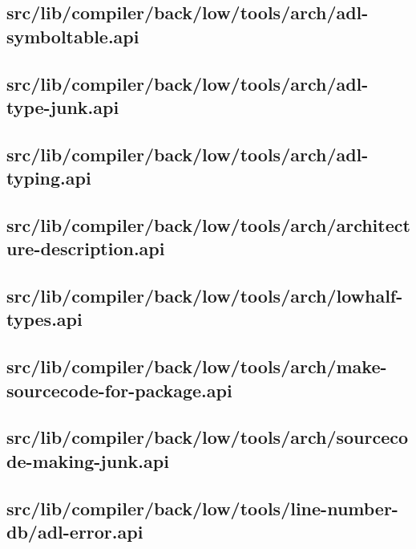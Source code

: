 \subsection{src/lib/compiler/back/low/tools/arch/adl-symboltable.api}


\subsection{src/lib/compiler/back/low/tools/arch/adl-type-junk.api}


\subsection{src/lib/compiler/back/low/tools/arch/adl-typing.api}


\subsection{src/lib/compiler/back/low/tools/arch/architecture-description.api}


\subsection{src/lib/compiler/back/low/tools/arch/lowhalf-types.api}


\subsection{src/lib/compiler/back/low/tools/arch/make-sourcecode-for-package.api}


\subsection{src/lib/compiler/back/low/tools/arch/sourcecode-making-junk.api}


\subsection{src/lib/compiler/back/low/tools/line-number-db/adl-error.api}



